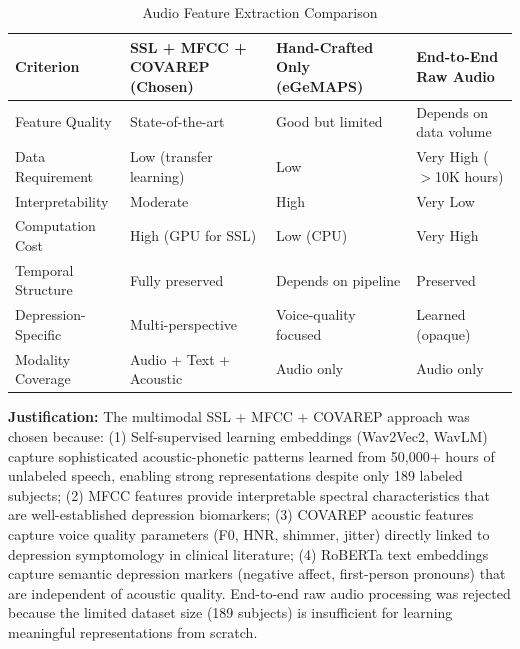 \documentclass[12pt]{article}
\begin{document}
	\begin{table}[H]
		\centering
		\caption{Audio Feature Extraction Comparison}
		\small
		\begin{tabular}{|p{2.2cm}|p{2.5cm}|p{2.5cm}|p{2.5cm}|}
			\hline
			\textbf{Criterion} & \textbf{SSL + MFCC + COVAREP (Chosen)} & \textbf{Hand-Crafted Only (eGeMAPS)} & \textbf{End-to-End Raw Audio} \\ \hline
			Feature Quality & State-of-the-art & Good but limited & Depends on data volume \\ \hline
			Data Requirement & Low (transfer learning) & Low & Very High ($>$10K hours) \\ \hline
			Interpretability & Moderate & High & Very Low \\ \hline
			Computation Cost & High (GPU for SSL) & Low (CPU) & Very High \\ \hline
			Temporal Structure & Fully preserved & Depends on pipeline & Preserved \\ \hline
			Depression-Specific & Multi-perspective & Voice-quality focused & Learned (opaque) \\ \hline
			Modality Coverage & Audio + Text + Acoustic & Audio only & Audio only \\ \hline
		\end{tabular}
	\end{table}

	\textbf{Justification:} The multimodal SSL + MFCC + COVAREP approach was chosen because: (1) Self-supervised learning embeddings (Wav2Vec2, WavLM) capture sophisticated acoustic-phonetic patterns learned from 50,000+ hours of unlabeled speech, enabling strong representations despite only 189 labeled subjects; (2) MFCC features provide interpretable spectral characteristics that are well-established depression biomarkers; (3) COVAREP acoustic features capture voice quality parameters (F0, HNR, shimmer, jitter) directly linked to depression symptomology in clinical literature; (4) RoBERTa text embeddings capture semantic depression markers (negative affect, first-person pronouns) that are independent of acoustic quality. End-to-end raw audio processing was rejected because the limited dataset size (189 subjects) is insufficient for learning meaningful representations from scratch.
\end{document}
